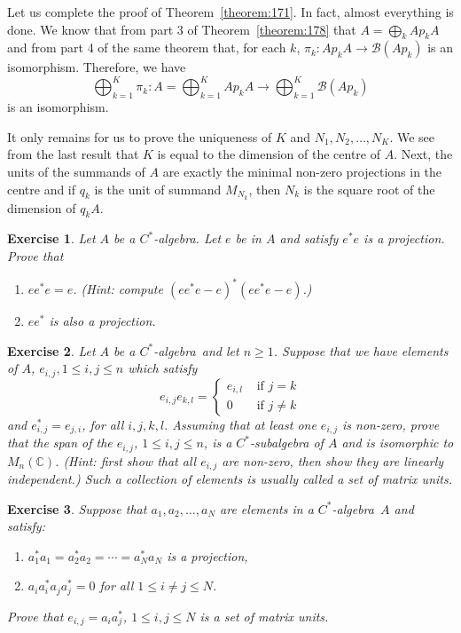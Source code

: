 \documentclass{book}
\newtheorem{exercise}{Exercise}[section]
\def\cstar{\(C^*\)-algebra}
\begin{document}
Let us complete the proof of Theorem~\ref{theorem:171}. In fact, almost everything
is done. We know that from part 3 of Theorem~\ref{theorem:178} that \(A = \bigoplus_k Ap_k A\) and
from part 4 of the same theorem that, for each \(k\), \(\pi_k : Ap_k A \rightarrow \mathcal{B}(Ap_k)\) is an
isomorphism. Therefore, we have
\[
\bigoplus^K_{k=1} \pi_k : A = \bigoplus^K_{k=1}Ap_k A \rightarrow \bigoplus^K_{k=1} \mathcal{B}(Ap_k)
\]
is an isomorphism.\par
It only remains for us to prove the uniqueness of \(K\) and \(N_1,N_2,\ldots,N_K\).
We see from the last result that \(K\) is equal to the dimension of the centre of
\(A\). Next, the units of the summands of \(A\) are exactly the minimal non-zero
projections in the centre and if \(q_k\) is the unit of summand \(M_{N_k}\), then \(N_k\) is
the square root of the dimension of \(q_k A\).
\begin{exercise}
  Let \(A\) be a \cstar. Let \(e\) be in \(A\) and satisfy \(e^*e\) is a
  projection. Prove that
  \begin{enumerate}
    \item \(ee^*e = e\). (Hint: compute \({(ee^*e - e)}^*(ee^*e - e)\).)
    \item \(ee^*\) is also a projection.
  \end{enumerate}
\end{exercise}
\begin{exercise}
  Let \(A\) be a \cstar\ and let \(n \geq 1\). Suppose that we have
  elements of \(A\), \(e_{i,j},1 \leq i,j \leq n\) which satisfy
  \begin{equation*}
  e_{i,j}e_{k,l} =
  \begin{cases}    
  e_{i,l} &\text{ if }j =k\\
  0 &\text{ if }j\neq k
  \end{cases}    
  \end{equation*}
  and \(e^*_{i,j} = e_{j,i}\), for all \(i,j,k,l\). Assuming that at least one \(e_{i,j}\) is non-zero,
  prove that the span of the \(e_{i,j}\), \(1 \leq i,j\leq n\), is a \(C^*\)-subalgebra of \(A\) and is
  isomorphic to \(M_n(\mathbb{C})\). (Hint: first show that all \(e_{i,j}\) are non-zero, then show
  they are linearly independent.) Such a collection of elements is usually called
  a set of matrix units.
\end{exercise}
\begin{exercise}
  Suppose that \(a_1,a_2,\ldots,a_N\) are elements in a \cstar\ \(A\)
  and satisfy:
  \begin{enumerate}
    \item \(a^*_1 a_1 = a^*_2 a_2 = \cdots = a^*_N a_N\) is a projection,
    \item \(a_i a^*_i a_j a^*_j = 0\) for all \(1 \leq i\ne j \leq N\).
  \end{enumerate}
  Prove that \(e_{i,j} = a_i a^*_j\), \(1 \leq i,j \leq N\) is a set of matrix units.
\end{exercise}
\end{document}
